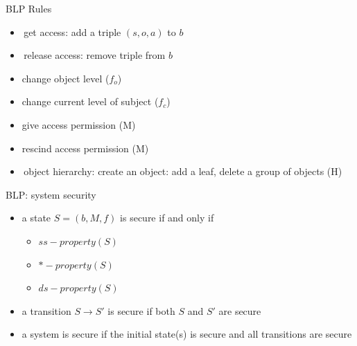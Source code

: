 \documentclass{beamer}
\begin{document}
\begin{frame}{BLP Rules}
  \begin{itemize}
    \item get access: add a triple $(s,o,a)$ to $b$
    \item release access: remove triple from $b$
    \item change object level ($f_o$)
    \item change current level of subject ($f_c$)
    \item give access permission (M) 
    \item rescind access permission (M) 
    \item object hierarchy: create an object: add a leaf,
      delete a group of objects (H)
  \end{itemize}
\end{frame}

\begin{frame}{BLP: system security}
  \begin{itemize}
  \item a state $S=(b,M,f)$ is secure if and only if 
    \begin{itemize}
      \item $ss-property(S)$
      \item $*-property(S)$
      \item $ds-property(S)$
    \end{itemize}
  \item a transition $S \rightarrow S'$ is secure if
    both $S$ and $S'$ are secure
  \item a system is secure if the initial state(s) is secure
    and all transitions are secure
  \end{itemize}
\end{frame}
\end{document}
